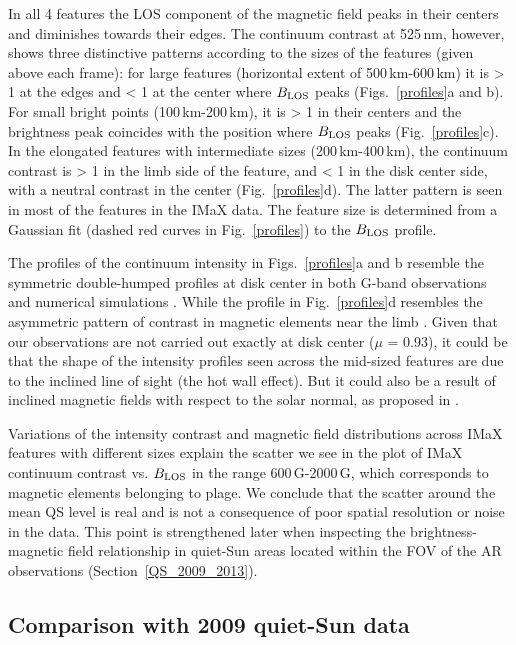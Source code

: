 \documentclass[goettingen, gauss, print]{thesis}
\begin{document}
In all 4 features the LOS component of the magnetic field peaks in their centers and diminishes towards their edges. The continuum contrast at 525\,nm, however, shows three distinctive patterns according to the sizes of the features (given above each frame): for large features (horizontal extent of 500\,km-600\,km) it is > 1 at the edges and < 1 at the center where $B_{\rm LOS}$ peaks (Figs.~\ref{profiles}a and b). For small bright points (100\,km-200\,km), it is > 1 in their centers and the brightness peak coincides with the position where $B_{\rm LOS}$ peaks (Fig.~\ref{profiles}c). In the elongated features with intermediate sizes (200\,km-400\,km), the continuum contrast is > 1 in the limb side of the feature, and < 1 in the disk center side, with a neutral contrast in the center (Fig.~\ref{profiles}d). The latter pattern is seen in most of the features in the  IMaX data.
The feature size is determined from a Gaussian fit (dashed red curves in Fig.~\ref{profiles}) to the $B_{\rm LOS}$ profile.

The profiles of the continuum intensity in Figs.~\ref{profiles}a and b resemble the symmetric double-humped profiles at disk center in both G-band observations and numerical simulations \citep{berger_solar_2004, steiner_recent_2005}. While the profile in Fig.~\ref{profiles}d resembles the asymmetric pattern of contrast in magnetic elements near the limb \citep{hirzberger_solar_2005,steiner_recent_2005}. Given that our observations are not carried out exactly at disk center ($\mu$ = 0.93), it could be that the shape of the intensity profiles seen across the mid-sized features are due to the inclined line of sight (the hot wall effect). But it could also be a result of inclined magnetic fields with respect to the solar normal, as proposed in \cite{keller_origin_2004}.

Variations of the intensity contrast and magnetic field distributions across IMaX features with different sizes explain the scatter we see in the plot of IMaX continuum contrast vs. $B_{\rm LOS}$ in the range 600\,G-2000\,G, which corresponds to magnetic elements belonging to plage. We conclude that the scatter around the mean QS level is real and is not a consequence of poor spatial resolution or noise in the data. This point is strengthened later when inspecting the brightness-magnetic field relationship in quiet-Sun areas located within the FOV of the AR observations (Section~\ref{QS_2009_2013}).

\subsection{Comparison with 2009 quiet-Sun data}
\label{QS_2009_AR}
\end{document}
